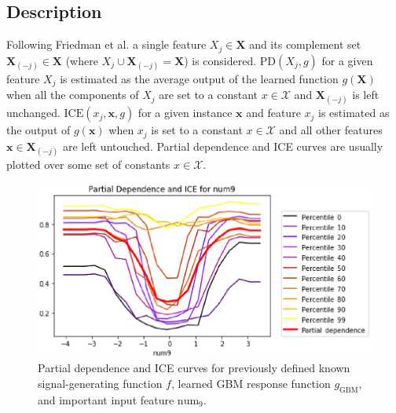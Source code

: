 \documentclass[11pt]{asaproc}
\begin{document}
\subsection{Description}
	
Following Friedman et al. a single feature $X_j \in \mathbf{X}$ and its complement set $\mathbf{X}_{(-j)} \in \mathbf{X}$ (where $X_j \cup \mathbf{X}_{(-j)} = \mathbf{X}$) is considered. $\text{PD}(X_j, g)$ for a given feature $X_j$ is estimated as the average output of the learned function $g(\mathbf{X})$ when all the components of $X_j$ are set to a constant $x \in \mathcal{X}$ and $\mathbf{X}_{(-j)}$ is left unchanged. $\text{ICE}(x_j, \mathbf{x}, g)$ for a given instance $\mathbf{x}$ and feature $x_j$ is estimated as the output of $g(\mathbf{x})$ when $x_j$ is set to a constant $x \in \mathcal{X}$ and all other features $\mathbf{x} \in \mathbf{X}_{(-j)}$ are left untouched. Partial dependence and ICE curves are usually plotted over some set of constants $x \in \mathcal{X}$. 

\begin{figure}[htb]
	\begin{center}
		\includegraphics[scale=0.5]{img/figure_4.eps}
		\caption{Partial dependence and ICE curves for previously defined known signal-generating function $f$,  learned GBM response function $g_{\text{GBM}}$, and important input feature $\text{num}_9$.}
		\label{fig:pdp_ice}
	\end{center}
\end{figure}
\end{document}
